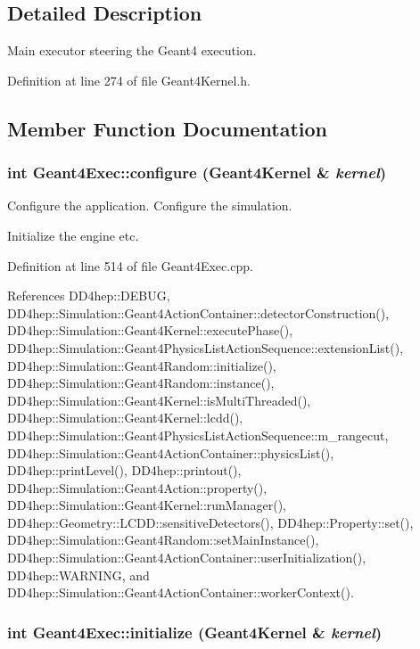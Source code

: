 \subsection{Detailed Description}
Main executor steering the Geant4 execution. 

Definition at line 274 of file Geant4Kernel.h.

\subsection{Member Function Documentation}
\hypertarget{class_d_d4hep_1_1_simulation_1_1_geant4_exec_a68d70832e5acb1c074ce12cae898af09}{
\subsubsection[{configure}]{\setlength{\rightskip}{0pt plus 5cm}int Geant4Exec::configure ({\bf Geant4Kernel} \& {\em kernel})}}
\label{class_d_d4hep_1_1_simulation_1_1_geant4_exec_a68d70832e5acb1c074ce12cae898af09}


Configure the application. Configure the simulation. 

Initialize the engine etc. 

Definition at line 514 of file Geant4Exec.cpp.

References DD4hep::DEBUG, DD4hep::Simulation::Geant4ActionContainer::detectorConstruction(), DD4hep::Simulation::Geant4Kernel::executePhase(), DD4hep::Simulation::Geant4PhysicsListActionSequence::extensionList(), DD4hep::Simulation::Geant4Random::initialize(), DD4hep::Simulation::Geant4Random::instance(), DD4hep::Simulation::Geant4Kernel::isMultiThreaded(), DD4hep::Simulation::Geant4Kernel::lcdd(), DD4hep::Simulation::Geant4PhysicsListActionSequence::m\_\-rangecut, DD4hep::Simulation::Geant4ActionContainer::physicsList(), DD4hep::printLevel(), DD4hep::printout(), DD4hep::Simulation::Geant4Action::property(), DD4hep::Simulation::Geant4Kernel::runManager(), DD4hep::Geometry::LCDD::sensitiveDetectors(), DD4hep::Property::set(), DD4hep::Simulation::Geant4Random::setMainInstance(), DD4hep::Simulation::Geant4ActionContainer::userInitialization(), DD4hep::WARNING, and DD4hep::Simulation::Geant4ActionContainer::workerContext().\hypertarget{class_d_d4hep_1_1_simulation_1_1_geant4_exec_ae5486a8c520af49cbcc5d5ba4323e773}{
\subsubsection[{initialize}]{\setlength{\rightskip}{0pt plus 5cm}int Geant4Exec::initialize ({\bf Geant4Kernel} \& {\em kernel})}}
\label{class_d_d4hep_1_1_simulation_1_1_geant4_exec_ae5486a8c520af49cbcc5d5ba4323e773}


